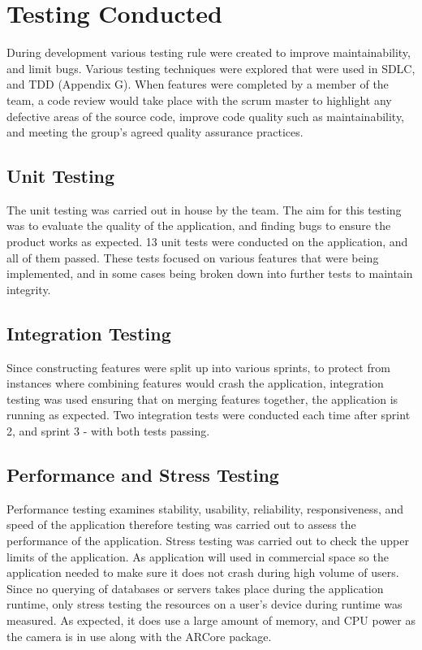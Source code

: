 \section{Testing Conducted}
During development various testing rule were created to improve maintainability, and limit bugs. Various testing techniques were explored that were used in SDLC, and TDD (Appendix G). When features were completed by a member of the team, a code review would take place with the scrum master to highlight any defective areas of the source code, improve code quality such as maintainability, and meeting the group's agreed quality assurance practices.

\subsection{Unit Testing}
The unit testing was carried out in house by the team. The aim for this testing was to evaluate the quality of the application, and finding bugs to ensure the product works as expected. 13 unit tests were conducted on the application, and all of them passed. These tests focused on various features that were being implemented, and in some cases being broken down into further tests to maintain integrity.

\subsection{Integration Testing}
Since constructing features were split up into various sprints, to protect from instances where combining features would crash the application, integration testing was used ensuring that on merging features together, the application is running as expected. Two integration tests were conducted each time after sprint 2, and sprint 3 - with both tests passing.

\subsection{Performance and Stress Testing}
Performance testing examines stability, usability, reliability, responsiveness, and speed of the application therefore testing was carried out to assess the performance of the application. Stress testing was carried out to check the upper limits of the application. As application will used in commercial space so the application needed to make sure it does not crash during high volume of users. Since no querying of databases or servers takes place during the application runtime, only stress testing the resources on a user's device during runtime was measured. As expected, it does use a large amount of memory, and CPU power as the camera is in use along with the ARCore package.

